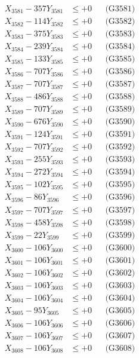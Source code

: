 \documentclass[a4paper,10pt]{article}
\begin{document}
{\begin{align}
\allowbreak
X_{3581} - 357Y_{3581} &\leq +0 && \text{(G3581)} \\
X_{3582} - 114Y_{3582} &\leq +0 && \text{(G3582)} \\
X_{3583} - 375Y_{3583} &\leq +0 && \text{(G3583)} \\
X_{3584} - 239Y_{3584} &\leq +0 && \text{(G3584)} \\
X_{3585} - 133Y_{3585} &\leq +0 && \text{(G3585)} \\
X_{3586} - 707Y_{3586} &\leq +0 && \text{(G3586)} \\
X_{3587} - 707Y_{3587} &\leq +0 && \text{(G3587)} \\
X_{3588} - 486Y_{3588} &\leq +0 && \text{(G3588)} \\
X_{3589} - 707Y_{3589} &\leq +0 && \text{(G3589)} \\
X_{3590} - 676Y_{3590} &\leq +0 && \text{(G3590)} \\
\allowbreak
X_{3591} - 124Y_{3591} &\leq +0 && \text{(G3591)} \\
X_{3592} - 707Y_{3592} &\leq +0 && \text{(G3592)} \\
X_{3593} - 255Y_{3593} &\leq +0 && \text{(G3593)} \\
X_{3594} - 272Y_{3594} &\leq +0 && \text{(G3594)} \\
X_{3595} - 102Y_{3595} &\leq +0 && \text{(G3595)} \\
X_{3596} - 86Y_{3596} &\leq +0 && \text{(G3596)} \\
X_{3597} - 707Y_{3597} &\leq +0 && \text{(G3597)} \\
X_{3598} - 458Y_{3598} &\leq +0 && \text{(G3598)} \\
X_{3599} - 22Y_{3599} &\leq +0 && \text{(G3599)} \\
X_{3600} - 106Y_{3600} &\leq +0 && \text{(G3600)} \\
\allowbreak
X_{3601} - 106Y_{3601} &\leq +0 && \text{(G3601)} \\
X_{3602} - 106Y_{3602} &\leq +0 && \text{(G3602)} \\
X_{3603} - 106Y_{3603} &\leq +0 && \text{(G3603)} \\
X_{3604} - 106Y_{3604} &\leq +0 && \text{(G3604)} \\
X_{3605} - 95Y_{3605} &\leq +0 && \text{(G3605)} \\
X_{3606} - 106Y_{3606} &\leq +0 && \text{(G3606)} \\
X_{3607} - 106Y_{3607} &\leq +0 && \text{(G3607)} \\
X_{3608} - 106Y_{3608} &\leq +0 && \text{(G3608)} \\

\end{align}}
\end{document}
